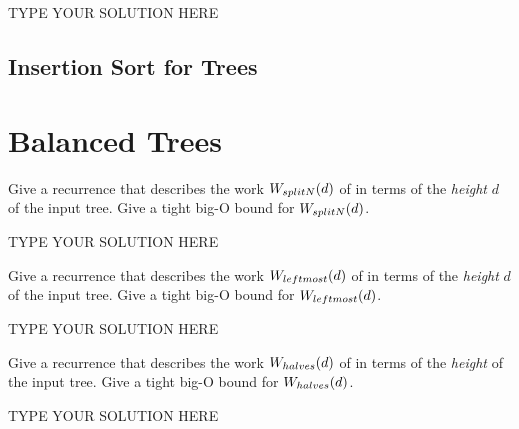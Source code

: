 \documentclass[11pt]{article}
\newcommand{\declarecommand}[1]{\providecommand{#1}{}\renewcommand{#1}}
\begin{document}
\begin{solution}
TYPE YOUR SOLUTION HERE
\end{solution}


\declarecommand{\Wa}{W_{\smle{rebalance}}}
\declarecommand{\Sa}{S_{\smle{rebalance}}}
\subsection{Insertion Sort for Trees}

\addtocounter{taskNum}{1}
\section{Balanced Trees}

\addtocounter{taskNum}{1}
\addtocounter{taskNum}{1}
\addtocounter{taskNum}{1}
\addtocounter{taskNum}{1}
\begin{task}{2} %
  Give a recurrence that describes the work $W_{\smle{splitN}}(d)$ of
   in terms of the \emph{height} $d$ of the input tree.  Give a
  tight big-O bound for $W_{\smle{splitN}}(d)$.
\end{task}

\begin{solution}
TYPE YOUR SOLUTION HERE
\end{solution}


\declarecommand{\Wa}{W_{\smle!splitN!}}
\declarecommand{\Wb}{W_{\smle!leftmost!}}
\declarecommand{\Wc}{W_{\smle!halves!}}
\declarecommand{\Wd}{W_{\smle!rebalance!}}
\begin{task}{2} %
  Give a recurrence that describes the work $W_{\smle{leftmost}}(d)$ of
   in terms of the \emph{height} $d$ of the input tree.  Give a
  tight big-O bound for $W_{\smle{leftmost}}(d)$.
\end{task}

\begin{solution}
TYPE YOUR SOLUTION HERE
\end{solution}


\declarecommand{\Wa}{W_{\smle!splitN!}}
\declarecommand{\Wb}{W_{\smle!leftmost!}}
\declarecommand{\Wc}{W_{\smle!halves!}}
\declarecommand{\Wd}{W_{\smle!rebalance!}}
\begin{task}{2} %
  Give a recurrence that describes the work $W_{\smle{halves}}(d)$ of
   in terms of the \emph{height} of the input tree.  Give a tight
  big-O bound for $W_{\smle{halves}}(d)$.
\end{task}

\begin{solution}
TYPE YOUR SOLUTION HERE
\end{solution}
\end{document}
